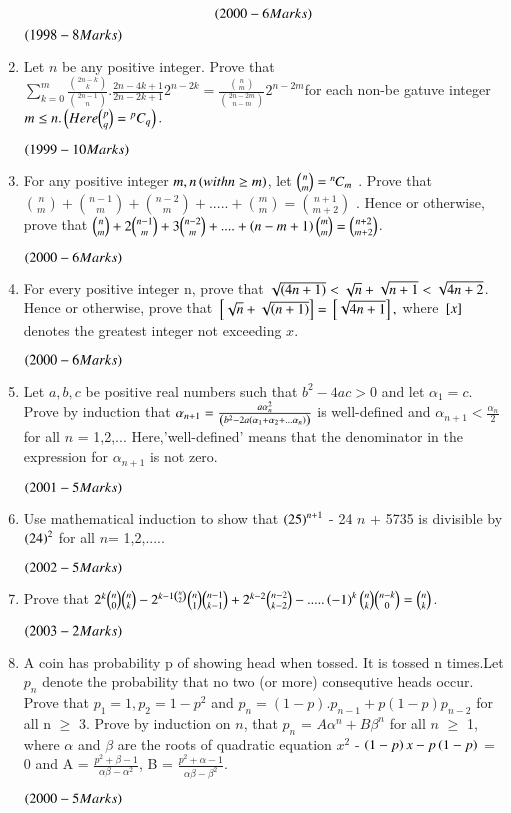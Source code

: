 \documentclass[journal,12pt,twocolumn]{IEEEtran}
\theoremstyle{remark}
\begin{document}
\begin{enumerate}[start=16]
$$\hfill\textcolor{black}{\brak{2000-6 Marks} }$$\hfill\textcolor{black}{ }$\hfill\textcolor{black}{\brak{1998-8 Marks} }$
\item 
Let $n$ be any positive integer. Prove that $\sum\limits^{m}_{k=0}\frac{\binom{2n-k}{k}}{\binom{2n-1}{n}}.\frac{2n-4k+1}{2n-2k+1}2^{n-2k}= \frac{\binom{n}{m}}{\binom{2n-2m}{n-m} } 2^{n-2m}$for each non-be gatuve integer $m\leq n. \left(Here \binom{p}{q} = {}^pC_q\right).$

$\hfill\textcolor{black}{\brak{1999-10 Marks} }$
\item
For any positive integer $m,n\left(with n \geq m\right)$, let $\binom{n}{m} ={{}^{n}\mkern-1muC_{m}}$ . Prove that $\binom{n}{m} + \binom{n-1}{m} + \binom{n-2}{m} + ..... + \binom{m}{m} = \binom{n+1}{m+2}$ . Hence or otherwise, prove that $\binom{n}{m} +2\binom{n-1}{m} +3\binom{n-2}{m}+....+ \left(n-m+1\right) \binom{m}{m} = \binom{n+2}{m+2}$.

$\hfill\textcolor{black}{\brak{2000-6 Marks} }$
\item
For every positive integer n, prove that $\sqrt{\left(4n+1\right)} < \sqrt{n} +\sqrt{n+1} < \sqrt{4n+2}$. Hence or otherwise, prove that ${}\left[\sqrt{n} + \sqrt{\left(n+1\right)}\right]= {}\left[\sqrt{4n+1}\right],$ where ${}\left[x\right]$ denotes the greatest integer not exceeding $x$.

$\hfill\textcolor{black}{\brak{2000-6 Marks} }$
\item
Let $a,b,c$ be positive real numbers such that $b^2 - 4ac > 0$ and let $\alpha_1 = c$. Prove by induction that $\alpha_{n+1} = \frac{a \alpha_{n}^2}{\left(b^2 - 2a \left(\alpha_1 + \alpha_2 + ... \alpha_n\right)\right)}$ is well-defined and $\alpha_{n+1} < \frac{\alpha_n}{2}$ for all $n$ = 1,2,...
\lbrak{}Here,'well-defined' means that the denominator in the expression for $\alpha_{n+1}$ is not zero.\rbrak{}

$\hfill\textcolor{black}{\brak{2001-5 Marks} }$
\item
Use mathematical induction to show that $\left(25\right)^{n+1}$ - 24 $n$ + 5735 is divisible by $\left(24\right)^2$ for all $n$= 1,2,.....

$\hfill\textcolor{black}{\brak{2002-5 Marks} }$
\item 
Prove that $2^k \binom{n}{0}\binom{n}{k} - 2^{k-1\binom{n}{2}} \binom{n}{1} \binom{n-1}{k-1} + 2^{k-2}\binom{n-2}{k-2} - .....\left(-1\right)^k \binom{n}{k}\binom{n-k}{0} = \binom{n}{k}$.

$\hfill\textcolor{black}{\brak{2003-2 Marks} }$\item
A coin has probability p of showing head when tossed. It is tossed n times.Let $p_n$ denote the probability that no two (or more) consequtive heads occur. Prove that $p_1=1 , p_2=1-p^2$ and $p_n = (1-p).p_{n-1} + p(1-p)p_{n-2}$ for all n $\geq$ 3. Prove by induction on $n$, that $p_n$ = $A\alpha^n + B\beta^n$ for all $n$ $\geq$ 1, where $\alpha$ and $\beta$ are the roots of quadratic equation $x^2$ - $\left(1-p\right)x - p\left(1-p\right)$ = 0 and A = $\frac{p^2 + \beta -1}{\alpha\beta-\alpha^2}$, B = $\frac{p^2 + \alpha -1}{\alpha\beta - \beta^2}$.

$\hfill\textcolor{black}{\brak{2000-5 Marks} }$



\end{enumerate}
\end{document}
